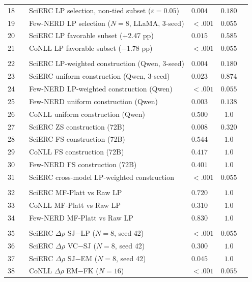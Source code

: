 \begin{table}[t]
\begin{tabular}{clllcc}
18 & & SciERC LP selection, non-tied subset ($\varepsilon{=}0.05$) & $0.004$ & $0.180$ &  \\
19 & & Few-NERD LP selection ($N{=}8$, LLaMA, 3-seed) & ${<}.001$ & $0.055$ & \\
20 & & SciERC LP favorable subset ($+$2.47 pp) & $0.015$ & $0.585$ &  \\
21 & & CoNLL LP favorable subset ($-$1.78 pp) & ${<}.001$ & $0.055$ & \\
\addlinespace
\multicolumn{6}{l}{\textit{Construction}} \\
22 & & SciERC LP-weighted construction (Qwen, 3-seed) & $0.004$ & $0.180$ &  \\
23 & & SciERC uniform construction (Qwen, 3-seed) & $0.023$ & $0.874$ &  \\
24 & & Few-NERD LP-weighted construction (Qwen) & ${<}.001$ & $0.055$ & \\
25 & & Few-NERD uniform construction (Qwen) & $0.003$ & $0.138$ &  \\
26 & & CoNLL uniform construction (Qwen) & $0.500$ & $1.0$ &  \\
27 & & SciERC ZS construction (72B) & $0.008$ & $0.320$ &  \\
28 & & SciERC FS construction (72B) & $0.544$ & $1.0$ &  \\
29 & & CoNLL FS construction (72B) & $0.417$ & $1.0$ &  \\
30 & & Few-NERD FS construction (72B) & $0.401$ & $1.0$ &  \\
31 & & SciERC cross-model LP-weighted construction & ${<}.001$ & $0.055$ & \\
\addlinespace
\multicolumn{6}{l}{\textit{Calibration}} \\
32 & & SciERC MF-Platt vs Raw LP & $0.720$ & $1.0$ &  \\
33 & & CoNLL MF-Platt vs Raw LP & $0.310$ & $1.0$ &  \\
34 & & Few-NERD MF-Platt vs Raw LP & $0.830$ & $1.0$ &  \\
\addlinespace
\multicolumn{6}{l}{\textit{Signal $\Delta\rho$}} \\
35 & & SciERC $\Delta\rho$ SJ$-$LP ($N{=}8$, seed 42) & ${<}.001$ & $0.055$ & \\
36 & & SciERC $\Delta\rho$ VC$-$SJ ($N{=}8$, seed 42) & $0.300$ & $1.0$ &  \\
37 & & SciERC $\Delta\rho$ SJ$-$EM ($N{=}8$, seed 42) & $0.045$ & $1.0$ &  \\
38 & & CoNLL $\Delta\rho$ EM$-$FK ($N{=}16$) & ${<}.001$ & $0.055$ & \\

\end{tabular}
\end{table}
